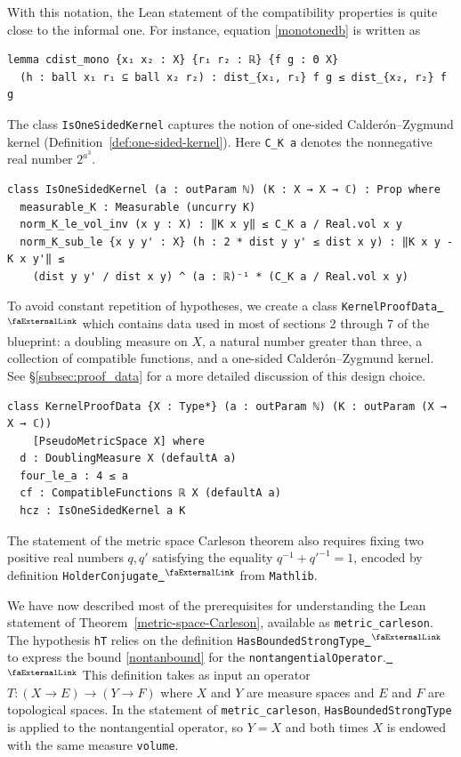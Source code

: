 \documentclass[12pt, reqno]{amsart}
\newcounter{lstlisting}[section]
\let\lean\lstinline
\newcommand{\mathlib}{\texttt{Mathlib}\xspace}
\newcommand{\extlink}{~\ensuremath{{}^\text{\faExternalLink}}}
\theoremstyle{definition}
\theoremstyle{plain}
\begin{document}
With this notation, the Lean statement of the compatibility properties is quite close to the informal one. For instance, equation \eqref{monotonedb} is written as
\begin{lstlisting}[mathescape]
lemma cdist_mono {x₁ x₂ : X} {r₁ r₂ : ℝ} {f g : Θ X}
  (h : ball x₁ r₁ ⊆ ball x₂ r₂) : dist_{x₁, r₁} f g ≤ dist_{x₂, r₂} f g
\end{lstlisting}

The class \lean{IsOneSidedKernel} captures the notion of one-sided Calderón--Zygmund kernel (Definition~\ref{def:one-sided-kernel}). Here \lean{C_K a} denotes the nonnegative real number $2 ^ {a ^ 3}$.

\begin{lstlisting}[mathescape]
class IsOneSidedKernel (a : outParam ℕ) (K : X → X → ℂ) : Prop where
  measurable_K : Measurable (uncurry K)
  norm_K_le_vol_inv (x y : X) : ‖K x y‖ ≤ C_K a / Real.vol x y
  norm_K_sub_le {x y y' : X} (h : 2 * dist y y' ≤ dist x y) : ‖K x y - K x y'‖ ≤
    (dist y y' / dist x y) ^ (a : ℝ)⁻¹ * (C_K a / Real.vol x y)
\end{lstlisting}

To avoid constant repetition of hypotheses, we create a class \lean{KernelProofData}\href{https://github.com/fpvandoorn/carleson/blob/AFM-frozen/Carleson/Defs.lean#L261-L266}{\extlink} which contains data used in most of sections 2 through 7 of the blueprint: a doubling measure on $X$, a natural number greater than three, a collection of compatible functions, and a one-sided Calderón--Zygmund kernel. See \S\ref{subsec:proof_data} for a more detailed discussion of this design choice.
\begin{lstlisting}[mathescape]
class KernelProofData {X : Type*} (a : outParam ℕ) (K : outParam (X → X → ℂ))
    [PseudoMetricSpace X] where
  d : DoublingMeasure X (defaultA a)
  four_le_a : 4 ≤ a
  cf : CompatibleFunctions ℝ X (defaultA a)
  hcz : IsOneSidedKernel a K
\end{lstlisting}

The statement of the metric space Carleson theorem also requires fixing two positive real numbers $q, q'$ satisfying the equality $q^{-1} + q'^{-1} = 1$, encoded by definition \lean{HolderConjugate}\href{https://github.com/leanprover-community/mathlib4/blob/b63493a4746b4651fceb3bcf3a4651cc36a4b8de/Mathlib/Data/Real/ConjExponents.lean#L59}{\extlink} from \mathlib.

We have now described most of the prerequisites for understanding the Lean statement of Theorem~\ref{metric-space-Carleson}, available as
\lean{metric_carleson}. The hypothesis \lean{hT} relies on the definition \lean{HasBoundedStrongType}\href{https://github.com/fpvandoorn/carleson/blob/AFM-frozen/Carleson/Defs.lean#L80-L86}{\extlink} to express the bound \eqref{nontanbound} for the
\lean{nontangentialOperator}.\href{https://github.com/fpvandoorn/carleson/blob/AFM-frozen/Carleson/Defs.lean#L211-L212}{\extlink} This definition takes as input an operator $T \colon (X \to E) \to (Y \to F)$ where $X$ and $Y$ are measure spaces and $E$ and $F$ are topological spaces.
In the statement of \lean{metric_carleson}, \lean{HasBoundedStrongType} is applied to the nontangential operator, so $Y = X$ and both times $X$ is endowed with the same measure \lean{volume}.
\end{document}
